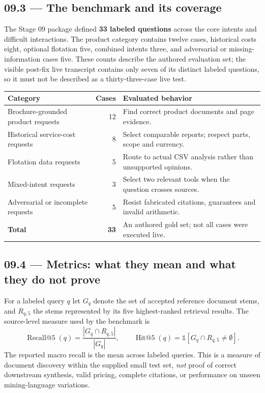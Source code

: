 \documentclass[11pt,a4paper]{article}
\begin{document}
\subsection{09.3 --- The benchmark and its coverage}
The Stage 09 package defined \textbf{33 labeled questions} across the core intents and difficult interactions. The product category contains twelve cases, historical costs eight, optional flotation five, combined intents three, and adversarial or missing-information cases five. These counts describe the authored evaluation set; the visible post-fix live transcript contains only seven of its distinct labeled questions, so it must not be described as a thirty-three-case live test.

\begin{tabularx}{\textwidth}{@{}Y r Y@{}}
\toprule
\textbf{Category} & \textbf{Cases} & \textbf{Evaluated behavior}\\\midrule
Brochure-grounded product requests & 12 & Find correct product documents and page evidence.\\
Historical service-cost requests & 8 & Select comparable reports; respect parts, scope and currency.\\
Flotation data requests & 5 & Route to actual CSV analysis rather than unsupported opinions.\\
Mixed-intent requests & 3 & Select two relevant tools when the question crosses sources.\\
Adversarial or incomplete requests & 5 & Resist fabricated citations, guarantees and invalid arithmetic.\\\midrule
\textbf{Total} & \textbf{33} & An authored gold set; not all cases were executed live.\\\bottomrule
\end{tabularx}

\subsection{09.4 --- Metrics: what they mean and what they do not prove}
For a labeled query \(q\) let \(G_q\) denote the set of accepted reference document stems, and \(R_{q,5}\) the stems represented by its five highest-ranked retrieval results. The source-level measure used by the benchmark is
\[
\operatorname{Recall@5}(q)=\frac{|G_q\cap R_{q,5}|}{|G_q|},
\qquad
\operatorname{Hit@5}(q)=\mathbb{1}[G_q\cap R_{q,5}\ne\emptyset].
\]
The reported macro recall is the mean across labeled queries. This is a measure of document discovery within the supplied small test set, \emph{not} proof of correct downstream synthesis, valid pricing, complete citations, or performance on unseen mining-language variations.
\end{document}
